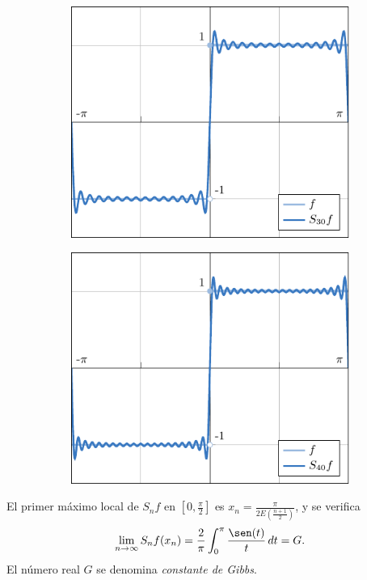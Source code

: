 \documentclass{beamer}
\begin{document}
\begin{frame}
\begin{figure}[H]
\begin{subfigure}[b]{0.49\textwidth}
        \includegraphics[scale = 0.58]{images/8.pdf}
    \end{subfigure}
    \begin{subfigure}[b]{0.49\textwidth}
        \centering
        \includegraphics[scale = 0.58]{images/9.pdf}
    \end{subfigure}
    \end{figure}
\end{frame}

\begin{frame}
    \begin{block}{}
        El primer máximo local de $S_nf$ en $[0,\frac{\pi}{2}]$ es $x_n = \frac{\pi}{2E(\frac{n+1}{2})}$, y se verifica
        \[\lim_{n\to\infty}S_nf(x_n) = \frac{2}{\pi}\integral{0}{\pi}{\frac{\sen(t)}{t}} = G.\]
        El número real $G$ se denomina \emph{constante de Gibbs}.
    \end{block}

\end{frame}
\end{document}
